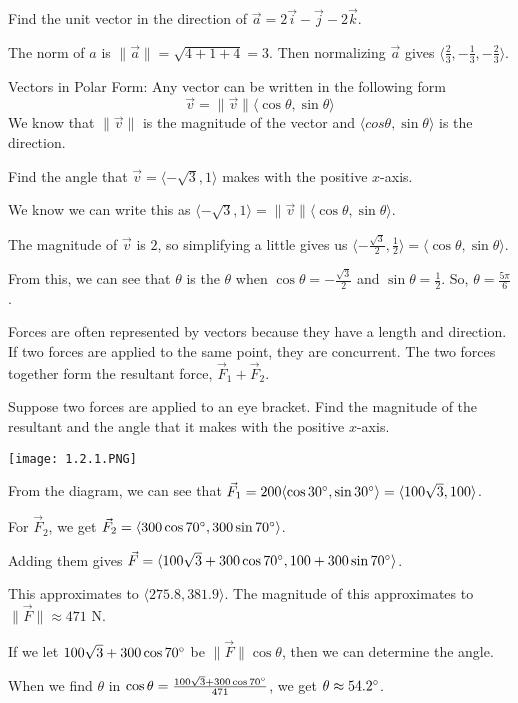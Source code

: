 \documentclass[../calc3.tex]{subfiles}
\begin{document}
\begin{example}
    Find the unit vector in the direction of $\vec{a}=2\vec{i}-\vec{j}-2\vec{k}$.

    The norm of $a$ is $\|\vec{a}\| = \sqrt{4+1+4}=3$. Then normalizing $\vec{a}$ gives $\langle \frac{2}{3},-\frac{1}{3},-\frac{2}{3}\rangle$.
\end{example}

Vectors in Polar Form: Any vector can be written in the following form 
\[ \vec{v}=\|\vec{v}\|\langle \cos\theta, \sin\theta \rangle \]
We know that $\|\vec{v}\|$ is the magnitude of the vector and $\langle cos\theta, \sin\theta\rangle$ is the direction.

\begin{example}
    Find the angle that $\vec{v}=\langle -\sqrt{3},1\rangle$ makes with the positive $x$-axis.

    We know we can write this as $\langle -\sqrt{3},1\rangle=\|\vec{v}\|\langle \cos\theta,\sin\theta\rangle$.

    The magnitude of $\vec{v}$ is $2$, so simplifying a little gives us $\langle -\frac{\sqrt{3}}{2},\frac{1}{2}\rangle=\langle \cos\theta,\sin\theta\rangle$.

     From this, we can see that $\theta$ is the $\theta$ when $\cos\theta = -\frac{\sqrt{3}}{2}$ and $\sin\theta = \frac{1}{2}$. So, $\theta=\frac{5\pi}{6}$.
\end{example}

Forces are often represented by vectors because they have a length and direction. If two forces are applied to the same point, they are concurrent. The two forces together form the resultant force, $\vec{F}_1+\vec{F}_2$.

\pagebreak
\begin{example}
    Suppose two forces are applied to an eye bracket. Find the magnitude of the resultant and the angle that it makes with the positive $x$-axis.
    \begin{center}
        \texttt{[image: 1.2.1.PNG]}
    \end{center}

    From the diagram, we can see that $\vec{F}_1=200\langle \cos 30\degree, \sin 30\degree\rangle = \langle 100\sqrt{3}, 100\rangle$.

    For $\vec{F}_2$, we get $\vec{F}_2=\langle 300\cos 70\degree, 300\sin 70\degree\rangle$.

    Adding them gives $\vec{F}=\langle 100\sqrt{3}+300\cos 70\degree, 100+300\sin 70\degree\rangle$.

    This approximates to $\langle 275.8,381.9\rangle$. The magnitude of this approximates to $\|\vec{F}\|\approx 471$ N.

    If we let $100\sqrt{3}+300\cos 70\degree$ be $\|\vec{F}\|\cos\theta$, then we can determine the angle. 

    When we find $\theta$ in $\cos\theta = \frac{100\sqrt{3}+300\cos 70\degree}{471}$, we get $\theta \approx 54.2\degree$.
\end{example}
\end{document}

